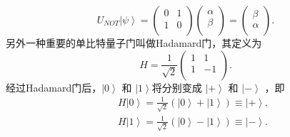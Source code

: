       \begin{equation}
       U_{NOT}\left\vert \psi\right\rangle = \left(
                   \begin{array}{cc}
                     0 & 1 \\
                     1 & 0 \\
                   \end{array}
                 \right)\left(
                                                                       \begin{array}{c}
                                                                         \alpha \\
                                                                         \beta \\
                                                                       \end{array}
                                                                     \right) = \left(
                                                                       \begin{array}{c}
                                                                         \beta \\
                                                                         \alpha \\
                                                                       \end{array}
                                                                     \right).
 \end{equation}
 另外一种重要的单比特量子门叫做Hadamard门，其定义为
      \begin{equation}
       H =\frac{1}{\sqrt{2}} \left(
                   \begin{array}{cc}
                     1 & 1 \\
                     1 & -1 \\
                   \end{array}
                 \right).
 \end{equation}
 经过Hadamard门后，$\left\vert 0\right\rangle$ 和 $\left\vert 1\right\rangle$将分别变成 $\left\vert +\right\rangle$ 和 $\left\vert -\right\rangle$ ，即
   \begin{eqnarray}
       &&H\left\vert 0\right\rangle =\frac{1}{\sqrt{2}} (\left\vert 0\right\rangle+\left\vert 1\right\rangle)\equiv \left\vert +\right\rangle,\nonumber \\
        &&H\left\vert 1\right\rangle =\frac{1}{\sqrt{2}} (\left\vert 0\right\rangle-\left\vert 1\right\rangle)\equiv \left\vert -\right\rangle.
 \end{eqnarray}

